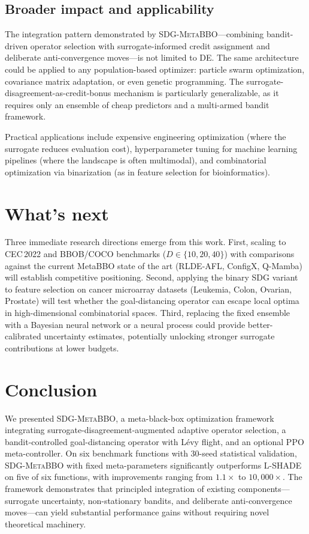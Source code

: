 \documentclass[preprint,12pt,number]{elsarticle}
\newcommand{\sdg}{\textsc{SDG-MetaBBO}}
\begin{document}
\subsection{Broader impact and applicability}

The integration pattern demonstrated by \sdg{}---combining bandit-driven operator selection with surrogate-informed credit assignment and deliberate anti-convergence moves---is not limited to DE. The same architecture could be applied to any population-based optimizer: particle swarm optimization, covariance matrix adaptation, or even genetic programming. The surrogate-disagreement-as-credit-bonus mechanism is particularly generalizable, as it requires only an ensemble of cheap predictors and a multi-armed bandit framework.

Practical applications include expensive engineering optimization (where the surrogate reduces evaluation cost), hyperparameter tuning for machine learning pipelines (where the landscape is often multimodal), and combinatorial optimization via binarization (as in feature selection for bioinformatics).

\section*{What's next}

Three immediate research directions emerge from this work. First, scaling to CEC\,2022 and BBOB/COCO benchmarks ($D \in \{10, 20, 40\}$) with comparisons against the current MetaBBO state of the art (RLDE-AFL, ConfigX, Q-Mamba) will establish competitive positioning. Second, applying the binary SDG variant to feature selection on cancer microarray datasets (Leukemia, Colon, Ovarian, Prostate) will test whether the goal-distancing operator can escape local optima in high-dimensional combinatorial spaces. Third, replacing the fixed ensemble with a Bayesian neural network or a neural process could provide better-calibrated uncertainty estimates, potentially unlocking stronger surrogate contributions at lower budgets.

\section{Conclusion}
\label{sec:conclusion}

We presented \sdg{}, a meta-black-box optimization framework integrating surrogate-disagreement-augmented adaptive operator selection, a bandit-controlled goal-distancing operator with L\'evy flight, and an optional PPO meta-controller. On six benchmark functions with 30-seed statistical validation, \sdg{} with fixed meta-parameters significantly outperforms L-SHADE on five of six functions, with improvements ranging from $1.1\times$ to $10{,}000\times$. The framework demonstrates that principled integration of existing components---surrogate uncertainty, non-stationary bandits, and deliberate anti-convergence moves---can yield substantial performance gains without requiring novel theoretical machinery.
\end{document}
